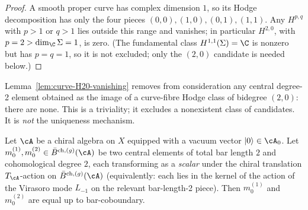 \begin{proof}
A smooth proper curve has complex dimension $1$, so its Hodge
decomposition has only the four pieces $(0,0), (1,0), (0,1), (1,1)$.
Any $H^{p,q}$ with $p > 1$ or $q > 1$ lies outside this range and
vanishes; in particular $H^{2,0}$, with $p = 2 > \dim_\C \Sigma = 1$,
is zero. \textup{(}The fundamental class $H^{1,1}(\Sigma) = \C$ is
nonzero but has $p = q = 1$, so it is not excluded; only the
$(2,0)$ candidate is needed below.\textup{)}
\end{proof}

\begin{remark}
\label{rem:central-m0-sub-a-hodge}
Lemma~\textup{\ref{lem:curve-H20-vanishing}} removes from consideration
any central degree-2 element obtained as the image of a
curve-fibre Hodge class of bidegree $(2,0)$: there are none. This
is a triviality; it excludes a nonexistent class of candidates.
It is \emph{not} the uniqueness mechanism.
\end{remark}

\begin{proposition}
\label{prop:central-m0-vacuum-proportionality}
\ClaimStatusProvedHere
{}
Let $\cA$ be a chiral algebra on $X$ equipped with a vacuum vector
$|0\rangle \in \cA_0$. Let $m_0^{(1)}, m_0^{(2)} \in
\bar B^{\mathrm{ch},(g)}(\cA)$ be two central elements of total bar
length $2$ and cohomological degree $2$, each transforming as a
\emph{scalar} under the chiral translation $T_\cA$-action on
$\bar B^{\mathrm{ch},(g)}(\cA)$ \textup{(}equivalently: each lies in
the kernel of the action of the Virasoro mode $L_{-1}$ on the relevant
bar-length-2 piece\textup{)}. Then $m_0^{(1)}$ and $m_0^{(2)}$ are
equal up to bar-coboundary.
\end{proposition}

